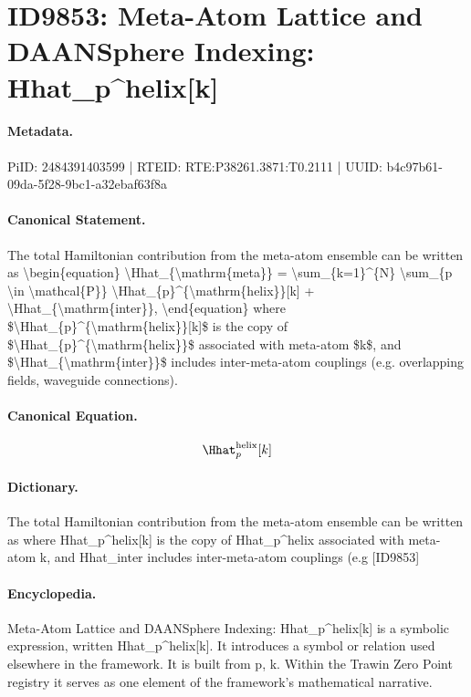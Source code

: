 \section*{ID9853: Meta-Atom Lattice and DAANSphere Indexing: Hhat\_p\textasciicircum{}helix[k]}
\paragraph{Metadata.}
PiID: 2484391403599 | RTEID: RTE:P38261.3871:T0.2111 | UUID: b4c97b61-09da-5f28-9bc1-a32ebaf63f8a

\paragraph{Canonical Statement.}
The total Hamiltonian contribution from the meta-atom ensemble can be written as \textbackslash{}begin\{equation\} \textbackslash{}Hhat\_\{\textbackslash{}mathrm\{meta\}\} = \textbackslash{}sum\_\{k=1\}\textasciicircum{}\{N\} \textbackslash{}sum\_\{p \textbackslash{}in \textbackslash{}mathcal\{P\}\} \textbackslash{}Hhat\_\{p\}\textasciicircum{}\{\textbackslash{}mathrm\{helix\}\}[k] + \textbackslash{}Hhat\_\{\textbackslash{}mathrm\{inter\}\}, \textbackslash{}end\{equation\} where \$\textbackslash{}Hhat\_\{p\}\textasciicircum{}\{\textbackslash{}mathrm\{helix\}\}[k]\$ is the copy of \$\textbackslash{}Hhat\_\{p\}\textasciicircum{}\{\textbackslash{}mathrm\{helix\}\}\$ associated with meta-atom \$k\$, and \$\textbackslash{}Hhat\_\{\textbackslash{}mathrm\{inter\}\}\$ includes inter-meta-atom couplings (e.g. overlapping fields, waveguide connections).

\paragraph{Canonical Equation.}
\[
\Hhat_{p}^{\mathrm{helix}}[k]
\]

\paragraph{Dictionary.}
The total Hamiltonian contribution from the meta-atom ensemble can be written as where Hhat\_p\textasciicircum{}helix[k] is the copy of Hhat\_p\textasciicircum{}helix associated with meta-atom k, and Hhat\_inter includes inter-meta-atom couplings (e.g [ID9853]

\paragraph{Encyclopedia.}
Meta-Atom Lattice and DAANSphere Indexing: Hhat\_p\textasciicircum{}helix[k] is a symbolic expression, written Hhat\_p\textasciicircum{}helix[k]. It introduces a symbol or relation used elsewhere in the framework. It is built from p, k. Within the Trawin Zero Point registry it serves as one element of the framework's mathematical narrative.
